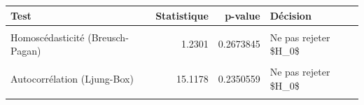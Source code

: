 \centering
\centering
\begin{tabular}[t]{lrrl}
\toprule
Test & Statistique & p-value & Décision\\
\midrule
\cellcolor{gray!10}{Centralité (Student)} & \cellcolor{gray!10}{-0.2752} & \cellcolor{gray!10}{0.7836021} & \cellcolor{gray!10}{Ne pas rejeter \$H\_0\$}\\
Homoscédasticité (Breusch-Pagan) & 1.2301 & 0.2673845 & Ne pas rejeter \$H\_0\$\\
\cellcolor{gray!10}{Indépendance résidus / t (cor.test)} & \cellcolor{gray!10}{-0.2579} & \cellcolor{gray!10}{0.7969292} & \cellcolor{gray!10}{Ne pas rejeter \$H\_0\$}\\
Autocorrélation (Ljung-Box) & 15.1178 & 0.2350559 & Ne pas rejeter \$H\_0\$\\
\cellcolor{gray!10}{Normalité (Shapiro-Wilk)} & \cellcolor{gray!10}{0.5537} & \cellcolor{gray!10}{0.0000000} & \cellcolor{gray!10}{Rejeter \$H\_0\$}\\
\bottomrule
\end{tabular}

